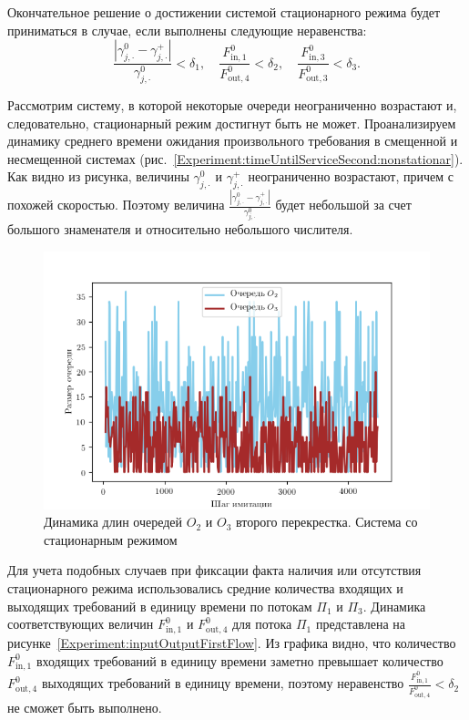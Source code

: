 Окончательное решение о достижении системой стационарного режима будет приниматься в случае, если выполнены следующие неравенства:
\begin{equation}
    \frac{|\gamma_{j,\cdot}^0 - \gamma_{j,\cdot}^+|}{\gamma_{j,\cdot}^0} < \delta_1, \quad
    \frac{F^{0}_{\text{in},1}}{F^{0}_{\text{out},4}} < \delta_2, \quad 
    \frac{F^{0}_{\text{in},3}}{F^{0}_{\text{out},3}} < \delta_3.
\end{equation}

Рассмотрим систему, в которой некоторые очереди неограниченно возрастают и, следовательно, стационарный режим достигнут быть не может. Проанализируем динамику среднего времени ожидания произвольного требования в смещенной и несмещенной системах (рис.~\ref{Experiment:timeUntilServiceSecond:nonstationar}).  Как видно из рисунка, величины $\gamma_{j,\cdot}^0$ и $ \gamma_{j,\cdot}^+$ неограниченно возрастают, причем с похожей скоростью. Поэтому величина $\frac{|\gamma_{j,\cdot}^0 - \gamma_{j,\cdot}^+|}{\gamma_{j,\cdot}^0} $ будет небольшой за счет большого знаменателя и относительно небольшого числителя. 


\begin{figure}[h]
\centering
\includegraphics[scale=1]{Dissertation/Work_structured/Pictures/pic_queues_2_stationar.png}
\caption{Динамика длин очередей $O_2$ и $O_3$ второго перекрестка. Система со стационарным режимом}
\label{Experiment:queues:2:stationar}
\end{figure}
Для учета подобных случаев при фиксации факта наличия или отсутствия стационарного режима использовались средние количества входящих и выходящих требований в единицу времени по потокам $\Pi_1$ и $\Pi_3$. Динамика соответствующих величин $F^{0}_{\text{in},1}$ и $F^{0}_{\text{out},4} $ для потока $\Pi_1$ представлена на рисунке~\ref{Experiment:inputOutputFirstFlow}. Из графика видно, что количество $F^{0}_{\text{in},1}$ входящих требований в единицу времени заметно превышает количество $F^{0}_{\text{out},4}$ выходящих требований в единицу времени, поэтому неравенство $\frac{F^{0}_{\text{in},1}}{F^{0}_{\text{out},4}} < \delta_2$ не сможет быть выполнено. 


